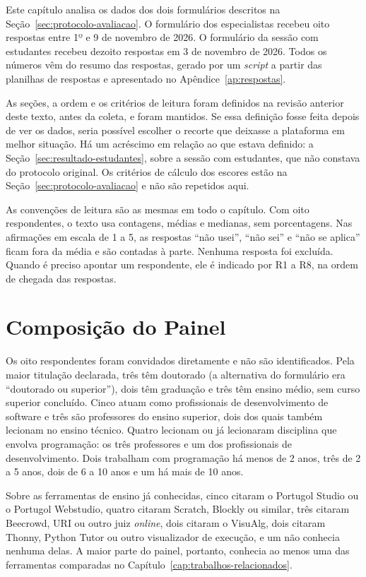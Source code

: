 Este capítulo analisa os dados dos dois formulários descritos na Seção~\ref{sec:protocolo-avaliacao}. O formulário dos especialistas recebeu oito respostas entre 1º e 9 de novembro de 2026. O formulário da sessão com estudantes recebeu dezoito respostas em 3 de novembro de 2026. Todos os números vêm do resumo das respostas, gerado por um \textit{script} a partir das planilhas de respostas e apresentado no Apêndice~\ref{ap:respostas}.

As seções, a ordem e os critérios de leitura foram definidos na revisão anterior deste texto, antes da coleta, e foram mantidos. Se essa definição fosse feita depois de ver os dados, seria possível escolher o recorte que deixasse a plataforma em melhor situação. Há um acréscimo em relação ao que estava definido: a Seção~\ref{sec:resultado-estudantes}, sobre a sessão com estudantes, que não constava do protocolo original. Os critérios de cálculo dos escores estão na Seção~\ref{sec:protocolo-avaliacao} e não são repetidos aqui.

As convenções de leitura são as mesmas em todo o capítulo. Com oito respondentes, o texto usa contagens, médias e medianas, sem porcentagens. Nas afirmações em escala de 1 a 5, as respostas ``não usei'', ``não sei'' e ``não se aplica'' ficam fora da média e são contadas à parte. Nenhuma resposta foi excluída. Quando é preciso apontar um respondente, ele é indicado por R1 a R8, na ordem de chegada das respostas.

\section{Composição do Painel}
\label{sec:resultado-painel}

Os oito respondentes foram convidados diretamente e não são identificados. Pela maior titulação declarada, três têm doutorado (a alternativa do formulário era ``doutorado ou superior''), dois têm graduação e três têm ensino médio, sem curso superior concluído. Cinco atuam como profissionais de desenvolvimento de software e três são professores do ensino superior, dois dos quais também lecionam no ensino técnico. Quatro lecionam ou já lecionaram disciplina que envolva programação: os três professores e um dos profissionais de desenvolvimento. Dois trabalham com programação há menos de 2 anos, três de 2 a 5 anos, dois de 6 a 10 anos e um há mais de 10 anos.

Sobre as ferramentas de ensino já conhecidas, cinco citaram o Portugol Studio ou o Portugol Webstudio, quatro citaram Scratch, Blockly ou similar, três citaram Beecrowd, URI ou outro juiz \textit{online}, dois citaram o VisuAlg, dois citaram Thonny, Python Tutor ou outro visualizador de execução, e um não conhecia nenhuma delas. A maior parte do painel, portanto, conhecia ao menos uma das ferramentas comparadas no Capítulo~\ref{cap:trabalhos-relacionados}.


